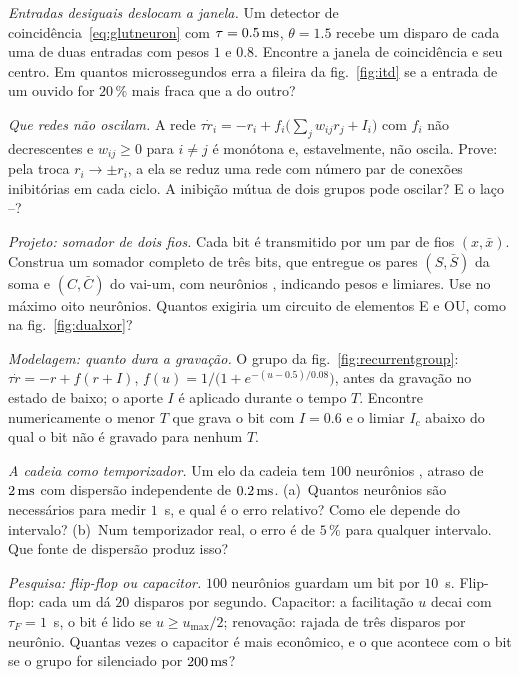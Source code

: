 \begin{exercise}[\lvlB]
\label{ex:02:2}
\emph{Entradas desiguais deslocam a janela.} Um detector de coincidência~\eqref{eq:glutneuron} com $\tau=0.5\,\text{ms}$, $\theta=1.5$ recebe um disparo de cada uma de duas entradas com pesos $1$ e $0.8$. Encontre a janela de coincidência e seu centro. Em quantos microssegundos erra a fileira da fig.~\ref{fig:itd} se a entrada de um ouvido for $20\,\%$ mais fraca que a do outro?
\end{exercise}

\begin{exercise}[\lvlB]
\label{ex:02:3}
\emph{Que redes não oscilam.} A rede $\tau\dot r_i=-r_i+f_i\bigl(\textstyle\sum_jw_{ij}r_j+I_i\bigr)$ com $f_i$ não decrescentes e $w_{ij}\ge0$ para $i\ne j$ é monótona e, estavelmente, não oscila. Prove: pela troca $r_i\to\pm r_i$, a ela se reduz uma rede com número par de conexões inibitórias em cada ciclo. A inibição mútua de dois grupos pode oscilar? E o laço --?
\end{exercise}

\begin{exercise}[\lvlB]
\label{ex:02:4}
\emph{Projeto: somador de dois fios.} Cada bit é transmitido por um par de fios $(x,\bar x)$. Construa um somador completo de três bits, que entregue os pares $(S,\bar S)$ da soma e $(C,\bar C)$ do vai-um, com neurônios , indicando pesos e limiares. Use no máximo oito neurônios. Quantos exigiria um circuito de elementos E e OU, como na fig.~\ref{fig:dualxor}?
\end{exercise}

\begin{exercise}[\lvlB]
\label{ex:02:5}
\emph{Modelagem: quanto dura a gravação.} O grupo da fig.~\ref{fig:recurrentgroup}: $\tau\dot r=-r+f(r+I)$, $f(u)=1/\bigl(1+e^{-(u-0.5)/0.08}\bigr)$, antes da gravação no estado de baixo; o aporte $I$ é aplicado durante o tempo $T$. Encontre numericamente o menor $T$ que grava o bit com $I=0.6$ e o limiar $I_c$ abaixo do qual o bit não é gravado para nenhum $T$.
\end{exercise}

\begin{exercise}[\lvlA]
\label{ex:02:6}
\emph{A cadeia como temporizador.} Um elo da cadeia tem $100$ neurônios , atraso de $2\,\text{ms}$ com dispersão independente de $0.2\,\text{ms}$. (a)~Quantos neurônios são necessários para medir $1$~s, e qual é o erro relativo? Como ele depende do intervalo? (b)~Num temporizador real, o erro é de $5\,\%$ para qualquer intervalo. Que fonte de dispersão produz isso?
\end{exercise}

\begin{exercise}[\lvlC]
\label{ex:02:7}
\emph{Pesquisa: flip-flop ou capacitor.} $100$ neurônios guardam um bit por $10$~s. Flip-flop: cada um dá $20$ disparos por segundo. Capacitor: a facilitação $u$ decai com $\tau_F=1$~s, o bit é lido se $u\ge u_{\max}/2$; renovação: rajada de três disparos por neurônio. Quantas vezes o capacitor é mais econômico, e o que acontece com o bit se o grupo for silenciado por $200\,\text{ms}$?
\end{exercise}
